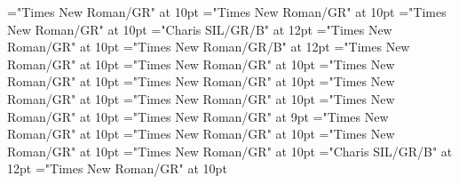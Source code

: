 \documentclass[gps1,twoside]{article}
\begin{document}
\font\spanspanabbreviationvariantentrytypevariantentrytypesvisiblevariantentryrefvisiblevariantentryrefsminorentryvariantbefore="Times New Roman/GR" at 10pt
\font\spanabbreviationvariantentrytypevariantentrytypesvisiblevariantentryrefvisiblevariantentryrefsminorentryvariantlastchildafter="Times New Roman/GR" at 10pt
\font{}="Times New Roman/GR" at 10pt
\font\spanbzhheadwordreferencedentryreferencedentriesvisiblevariantentryrefvisiblevariantentryrefsminorentryvariant="Charis SIL/GR/B" at 12pt
\font\spanspanheadwordreferencedentryreferencedentriesvisiblevariantentryrefvisiblevariantentryrefsminorentryvariantbefore="Times New Roman/GR" at 10pt
\font\spanheadwordreferencedentryreferencedentriesvisiblevariantentryrefvisiblevariantentryrefsminorentryvariant="Times New Roman/GR/B" at 12pt
\font\spanspandefinitionorglossreferencedentryreferencedentriesvisiblevariantentryrefvisiblevariantentryrefsminorentryvariantbefore="Times New Roman/GR" at 10pt
\font\spandefinitionorglossreferencedentryreferencedentriesvisiblevariantentryrefvisiblevariantentryrefsminorentryvariantfirstchildbefore="Times New Roman/GR" at 10pt
\font\spanspansummaryvisiblevariantentryrefvisiblevariantentryrefsminorentryvariantbefore="Times New Roman/GR" at 10pt
\font\spansummaryvisiblevariantentryrefvisiblevariantentryrefsminorentryvariantfirstchildbefore="Times New Roman/GR" at 10pt
\font\spanspancomplexformentryrefsminorentryvariantbefore="Times New Roman/GR" at 10pt
\font\complexformentryrefsminorentryvariantbefore="Times New Roman/GR" at 10pt
\font\complexformentryrefsminorentryvariantafter="Times New Roman/GR" at 10pt
\font\complexformtypecomplexformtypecomplexformtypescomplexformentryrefcomplexformentryrefsminorentryvariantbefore="Times New Roman/GR" at 9pt
\font\complexformtypescomplexformentryrefcomplexformentryrefsminorentryvariantafter="Times New Roman/GR" at 10pt
\font\spanspanabbreviationcomplexformtypecomplexformtypescomplexformentryrefcomplexformentryrefsminorentryvariantbefore="Times New Roman/GR" at 10pt
\font\spanabbreviationcomplexformtypecomplexformtypescomplexformentryrefcomplexformentryrefsminorentryvariantlastchildafter="Times New Roman/GR" at 10pt
\font{}="Times New Roman/GR" at 10pt
\font\spanbzhheadwordreferencedentryreferencedentriescomplexformentryrefcomplexformentryrefsminorentryvariant="Charis SIL/GR/B" at 12pt
\font\spanspanheadwordreferencedentryreferencedentriescomplexformentryrefcomplexformentryrefsminorentryvariantbefore="Times New Roman/GR" at 10pt
\end{document}

